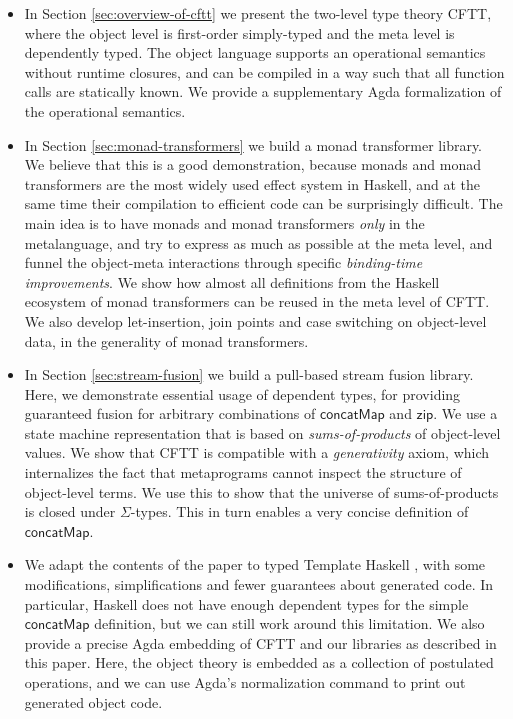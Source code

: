 \documentclass[acmsmall,screen,review,anonymous]{acmart}
\newcommand{\mit}[1]{{\mathsf{#1}}}
\newcommand{\msf}[1]{{\mathsf{#1}}}
\newcommand{\concatMap}{\msf{concatMap}}
\theoremstyle{remark}
\begin{document}
\begin{itemize}
\item In Section \ref{sec:overview-of-cftt} we present the two-level type theory
  CFTT, where the object level is first-order simply-typed and the meta level is
  dependently typed. The object language supports an operational semantics without
  runtime closures, and can be compiled in a way such that all function calls
  are statically known. We provide a supplementary Agda formalization of the
  operational semantics.
\item In Section \ref{sec:monad-transformers} we build a monad transformer library. We believe
  that this is a good demonstration, because monads and monad transformers are
  the most widely used effect system in Haskell, and at the same time their
  compilation to efficient code can be surprisingly difficult. The main idea is
  to have monads and monad transformers \emph{only} in the metalanguage, and try
  to express as much as possible at the meta level, and funnel the object-meta
  interactions through specific \emph{binding-time improvements}.  We show how
  almost all definitions from the Haskell ecosystem of monad transformers can be
  reused in the meta level of CFTT. We also develop let-insertion, join points
  and case switching on object-level data, in the generality of monad transformers.
\item In Section \ref{sec:stream-fusion} we build a pull-based stream fusion library. Here,
  we demonstrate essential usage of dependent types, for providing guaranteed
  fusion for arbitrary combinations of $\concatMap$ and $\mit{zip}$. We use a
  state machine representation that is based on \emph{sums-of-products} of
  object-level values. We show that CFTT is compatible with a
  \emph{generativity} axiom, which internalizes the fact that metaprograms
  cannot inspect the structure of object-level terms. We use this to show that
  the universe of sums-of-products is closed under $\Sigma$-types. This in turn
  enables a very concise definition of $\concatMap$.
\item
  We adapt the contents of the paper to typed Template Haskell
  \cite{DBLP:journals/pacmpl/XiePLWYW22}, with some modifications,
  simplifications and fewer guarantees about generated code.  In particular,
  Haskell does not have enough dependent types for the simple $\concatMap$
  definition, but we can still work around this limitation. We also provide a
  precise Agda embedding of CFTT and our libraries as described in this
  paper. Here, the object theory is embedded as a collection of postulated
  operations, and we can use Agda's normalization command to print out generated
  object code.
\end{itemize}
\end{document}
